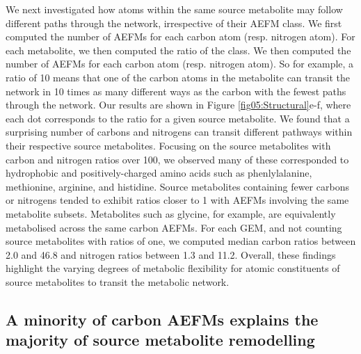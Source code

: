 \documentclass[12pt]{article}
\begin{document}
We next investigated how atoms within the same source metabolite may
follow different paths through the network, irrespective of their AEFM
class. We first computed the number of AEFMs for each carbon atom (resp.
nitrogen atom). For each metabolite, we then computed the ratio of the
class. We then computed the number of AEFMs for each carbon atom (resp.
nitrogen atom). So for example, a ratio of 10 means that one of the carbon
atoms in the metabolite can transit the network in 10 times as many
different ways as the carbon with the fewest paths through the network.
Our results are shown in Figure \ref{fig05:Structural}e-f, where each dot
corresponds to the ratio for a given source metabolite. We found that
a surprising number of carbons and nitrogens can transit different
pathways within their respective source metabolites. Focusing on the
source metabolites with carbon and nitrogen ratios over 100, we observed
many of these corresponded to hydrophobic and positively-charged amino
acids such as phenlylalanine, methionine, arginine, and histidine. Source
metabolites containing fewer carbons or nitrogens tended to exhibit ratios
closer to 1 with AEFMs involving the same metabolite subsets. Metabolites
such as glycine, for example, are equivalently metabolised across the same
carbon AEFMs. For each GEM, and not counting source metabolites with
ratios of one, we computed median carbon ratios between 2.0 and 46.8 and
nitrogen ratios between 1.3 and 11.2. Overall, these findings highlight
the varying degrees of metabolic flexibility for atomic constituents of
source metabolites to transit the metabolic network.

\subsection*{A minority of carbon AEFMs explains the majority of source metabolite remodelling}

\end{document}
